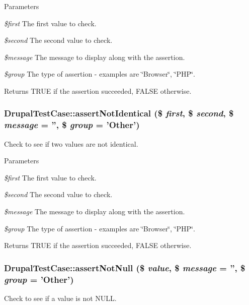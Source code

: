\begin{DoxyParams}{Parameters}
\item[{\em \$first}]The first value to check. \item[{\em \$second}]The second value to check. \item[{\em \$message}]The message to display along with the assertion. \item[{\em \$group}]The type of assertion -\/ examples are \char`\"{}Browser\char`\"{}, \char`\"{}PHP\char`\"{}. \end{DoxyParams}
\begin{DoxyReturn}{Returns}
TRUE if the assertion succeeded, FALSE otherwise. 
\end{DoxyReturn}
\hypertarget{classDrupalTestCase_a77cb46d51231f322d73e12a9ffa92b45}{
\subsubsection[{assertNotIdentical}]{\setlength{\rightskip}{0pt plus 5cm}DrupalTestCase::assertNotIdentical (\$ {\em first}, \/  \$ {\em second}, \/  \$ {\em message} = {\ttfamily ''}, \/  \$ {\em group} = {\ttfamily 'Other'})}}
\label{classDrupalTestCase_a77cb46d51231f322d73e12a9ffa92b45}
Check to see if two values are not identical.


\begin{DoxyParams}{Parameters}
\item[{\em \$first}]The first value to check. \item[{\em \$second}]The second value to check. \item[{\em \$message}]The message to display along with the assertion. \item[{\em \$group}]The type of assertion -\/ examples are \char`\"{}Browser\char`\"{}, \char`\"{}PHP\char`\"{}. \end{DoxyParams}
\begin{DoxyReturn}{Returns}
TRUE if the assertion succeeded, FALSE otherwise. 
\end{DoxyReturn}
\hypertarget{classDrupalTestCase_a94d00b7ee53b58205fe55ddc9bff788a}{
\subsubsection[{assertNotNull}]{\setlength{\rightskip}{0pt plus 5cm}DrupalTestCase::assertNotNull (\$ {\em value}, \/  \$ {\em message} = {\ttfamily ''}, \/  \$ {\em group} = {\ttfamily 'Other'})}}
\label{classDrupalTestCase_a94d00b7ee53b58205fe55ddc9bff788a}
Check to see if a value is not NULL.



